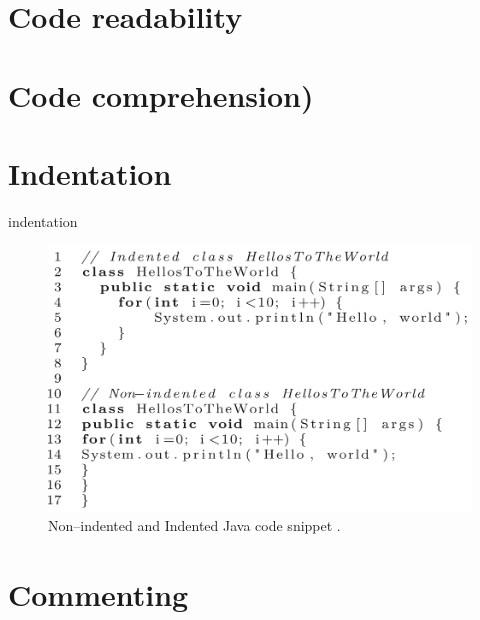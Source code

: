 \section{Code readability}
\section{Code comprehension)}
\section{Indentation}

indentation 


\begin{figure} [H]
  \centering
  \includegraphics [scale=0.7]
  {figures/indentation_ex.png}
  \caption{Non–indented and Indented Java code snippet \cite{hanenberg2024indentation}.}
  \label{fig:AnhangsChor}
\end{figure}



\section{Commenting}


